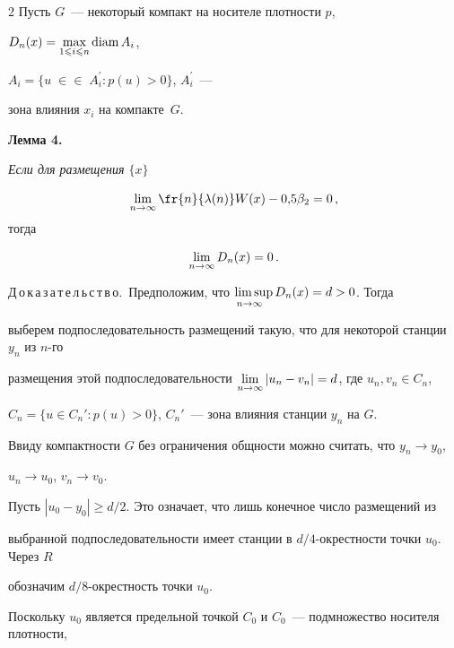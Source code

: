 \begin{multicols}{2}
Пусть $G$~--- некоторый компакт на носителе плотности $p$,


$D_n(x)=\max\limits_{1\leqslant i\leqslant n}\mathrm{diam}\,A_i$,


$A_i=\{u\;\in$\linebreak $\in\;A_i^{'} : p(u)>0 \}$, $A_i^{'}$~---


зона влияния $x_i$ на компакте~$G$.





\medskip


\noindent


\textbf{Лемма 4.} {\it Если для размещения $\{x\}$


$$


\liml{n\rightarrow\infty}\fr{n}{\lambda(n)}W(x)-0{,}5\beta_2=0\,,$$ тогда}


$$


\liml{n\rightarrow\infty} D_n(x)=0\,.


$$





\smallskip


\noindent


Д\,о\,к\,а\,з\,а\,т\,е\,л\,ь\,с\,т\,в\,о.~Предположим, что $\limsup\limits_{n \to \infty~~} D_n(x)=d>0$. Тогда


выберем подпоследовательность размещений такую, что для некоторой станции $y_n$ из $n$-го


размещения этой подпоследовательности $\lim\limits_{n\to\infty} |u_n-v_n|=d$, где $u_n, v_n \in C_n$,


$C_n=\{u\in C_n' : p(u)>0 \}$, $C_n'$~--- зона влияния станции $y_n$ на $G$.





Ввиду компактности $G$ без ограничения общности можно считать, что $y_n \to y_0$,


$u_n \to u_0$, $v_n \to v_0 $.





Пусть $|u_0 - y_0|\geqslant d/2$. Это означает, что лишь конечное число размещений из


выбранной подпоследовательности имеет станции в $d/4$-окрестности точки $u_0$. Через $R$


обозначим $d/8$-окрестность точки $u_0$.





Поскольку $u_0$ является предельной точкой $C_0$ и $C_0$~--- подмножество носителя плотности,



\end{multicols}
